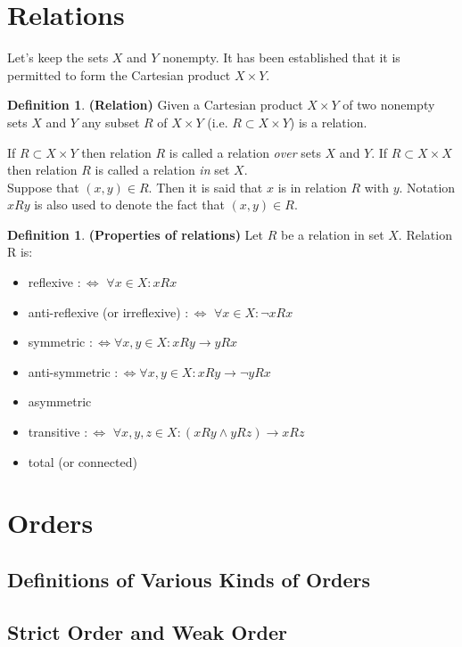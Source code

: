 \documentclass[12pt]{article}
\theoremstyle{plain}
\theoremstyle{definition}
\newtheorem{defn}[thm]{Definition}
\begin{document}
\section{Relations}
Let's keep the sets $X$ and $Y$ nonempty. It has been established that it is permitted
to form the Cartesian product $X \times Y$.

\begin{defn}
\textbf{(Relation)}
Given a Cartesian product $X \times Y$ of two nonempty sets $X$ and $Y$ any subset $R$ of
$X \times Y$ (i.e. $R \subset X \times Y$) is a relation.
\end{defn}
If $R \subset X \times Y$ then relation $R$ is called a relation \textit{over} 
sets $X$ and $Y$. 
If $R \subset X \times X$ then relation $R$ is called a relation \textit{in} set $X$. \\
\indent Suppose that $(x, y) \in R$. Then it is said that $x$ is in relation $R$ 
with $y$. Notation $xRy$ is also used to denote the fact that $(x, y) \in R$.

\begin{defn}
\textbf{(Properties of relations)} Let $R$ be a relation in set $X$. 
Relation R is:
\begin{itemize}
\item[1. ] reflexive $:\Leftrightarrow$ $\forall x \in X: xRx$ 
\item[2. ] anti-reflexive (or irreflexive) 
$:\Leftrightarrow$ $\forall x \in X: \lnot xRx$ 
\item[2. ] symmetric $:\Leftrightarrow \forall x, y \in X: xRy \rightarrow yRx$
\item[3. ] anti-symmetric
$:\Leftrightarrow \forall x, y \in X: xRy \rightarrow \lnot yRx$
\item[4. ] asymmetric 
\item[5. ] transitive
$:\Leftrightarrow$ $\forall x, y, z \in X: (xRy \wedge yRz) \rightarrow xRz$ 
\item[6. ] total (or connected)
\end{itemize}
\end{defn}


\section{Orders}
\subsection{Definitions of Various Kinds of Orders}
\subsection{Strict Order and Weak Order}
\end{document}
